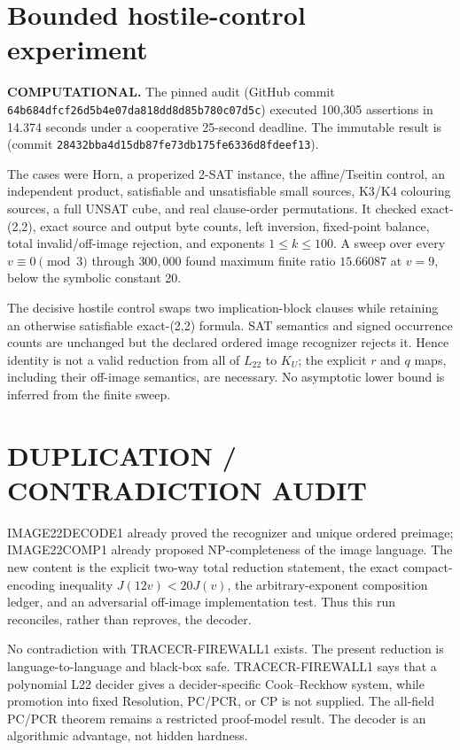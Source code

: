 \documentclass[11pt]{article}
\newcommand{\Ltwo}{L_{22}}
\newcommand{\KU}{K_U}
\newcommand{\status}[1]{\textbf{#1}}
\begin{document}
\section*{Bounded hostile-control experiment}
\status{COMPUTATIONAL.}  The pinned audit
(GitHub commit \texttt{64b684dfcf26d5b4e07da818dd8d85b780c07d5c}) executed 100,305 assertions in 14.374 seconds under a cooperative 25-second deadline.  The immutable result is
(commit \texttt{28432bba4d15db87fe73db175fe6336d8fdeef13}).

The cases were Horn, a properized 2-SAT instance, the affine/Tseitin control, an independent product, satisfiable and unsatisfiable small sources, K3/K4 colouring sources, a full UNSAT cube, and real clause-order permutations.  It checked exact-(2,2), exact source and output byte counts, left inversion, fixed-point balance, total invalid/off-image rejection, and exponents $1\leq k\leq100$.  A sweep over every $v\equiv0\pmod3$ through $300{,}000$ found maximum finite ratio $15.66087$ at $v=9$, below the symbolic constant 20.

The decisive hostile control swaps two implication-block clauses while retaining an otherwise satisfiable exact-(2,2) formula.  SAT semantics and signed occurrence counts are unchanged but the declared ordered image recognizer rejects it.  Hence identity is not a valid reduction from all of $\Ltwo$ to $\KU$; the explicit $r$ and $q$ maps, including their off-image semantics, are necessary.  No asymptotic lower bound is inferred from the finite sweep.

\section*{DUPLICATION / CONTRADICTION AUDIT}
IMAGE22DECODE1 already proved the recognizer and unique ordered preimage; IMAGE22COMP1 already proposed NP-completeness of the image language.  The new content is the explicit two-way total reduction statement, the exact compact-encoding inequality $J(12v)<20J(v)$, the arbitrary-exponent composition ledger, and an adversarial off-image implementation test.  Thus this run reconciles, rather than reproves, the decoder.

No contradiction with TRACECR-FIREWALL1 exists.  The present reduction is language-to-language and black-box safe.  TRACECR-FIREWALL1 says that a polynomial L22 decider gives a decider-specific Cook--Reckhow system, while promotion into fixed Resolution, PC/PCR, or CP is not supplied.  The all-field PC/PCR theorem remains a restricted proof-model result.  The decoder is an algorithmic advantage, not hidden hardness.
\end{document}
